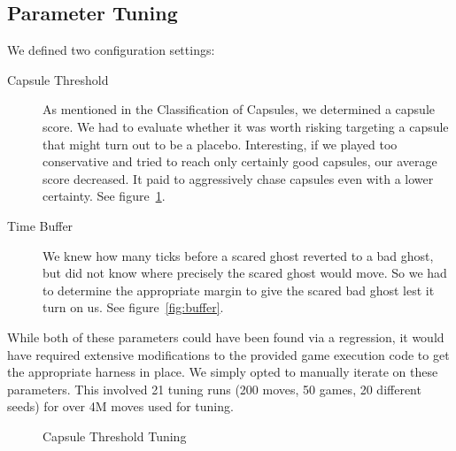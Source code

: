 \documentclass[11pt, oneside]{article}   	%
\begin{document}
\subsection{Parameter Tuning}
We defined two configuration settings:
\begin{description}
	\item[Capsule Threshold]As mentioned in the Classification of Capsules, we determined a capsule score. We had to evaluate whether it was worth risking targeting a capsule that might turn out to be a placebo. Interesting, if we played too conservative and tried to reach only certainly good capsules, our average score decreased. It paid to aggressively chase capsules even with a lower certainty. See figure~\ref{fig:threshold}.
	\item[Time Buffer]We knew how many ticks before a scared ghost reverted to a bad ghost, but did not know where precisely the scared ghost would move. So we had to determine the appropriate margin to give the scared bad ghost lest it turn on us. See figure~\ref{fig:buffer}.
\end{description}
While both of these parameters could have been found via a regression, it would have required extensive modifications to the provided game execution code to get the appropriate harness in place. We simply opted to manually iterate on these parameters. This involved 21 tuning runs (200 moves, 50 games, 20 different seeds) for over 4M moves used for tuning.
\begin{figure}[h!]
  \label{fig:threshold}
  \centering
  \caption{Capsule Threshold Tuning}
 \end{figure}
\end{document}
